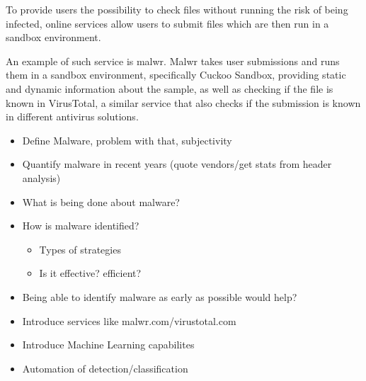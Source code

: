 \documentclass{llncs}
\begin{document}
To provide users the possibility to check files without running the risk of being infected, online services allow users to submit files which are then run in a sandbox environment.

An example of such service is malwr. Malwr takes user submissions and runs them in a sandbox environment, specifically Cuckoo Sandbox, providing static and dynamic information about the sample, as well as checking if the file is known in VirusTotal, a similar service that also checks if the submission is known in different antivirus solutions.


\hfill \break


\begin{itemize}
	\item Define Malware, problem with that, subjectivity
	\item Quantify malware in recent years (quote vendors/get stats from header analysis)
	\item What is being done about malware?
	\item How is malware identified?
	\begin{itemize}
		\item Types of strategies
		\item Is it effective? efficient?
	\end{itemize}
	\item Being able to identify malware as early as possible would help?
	\item Introduce services like malwr.com/virustotal.com
	\item Introduce Machine Learning capabilites
	\item Automation of detection/classification
\end{itemize}

%
\end{document}
